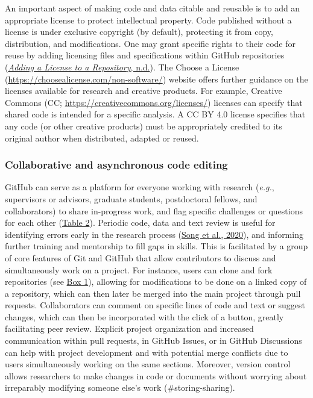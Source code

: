 An important aspect of making code and data citable and reusable is to add an appropriate license to protect intellectual property.
Code published without a license is under exclusive copyright (by default), protecting it from copy, distribution, and modifications.
One may grant specific rights to their code for reuse by adding licensing files and specifications within GitHub repositories (\protect\hyperlink{ref-TOsASkn5}{\emph{Adding a License to a Repository}, n.d.}).
The Choose a License (\url{https://choosealicense.com/non-software/}) website offers further guidance on the licenses available for research and creative products.
For example, Creative Commons (CC; \url{https://creativecommons.org/licenses/}) licenses can specify that shared code is intended for a specific analysis.
A CC BY 4.0 license specifies that any code (or other creative products) must be appropriately credited to its original author when distributed, adapted or reused.

\hypertarget{code-editing}{%
\subsubsection{Collaborative and asynchronous code editing}\label{code-editing}}

GitHub can serve as a platform for everyone working with research (\emph{e.g.}, supervisors or advisors, graduate students, postdoctoral fellows, and collaborators) to share in-progress work, and flag specific challenges or questions for each other (\protect\hyperlink{tbl:roles}{Table 2}).
Periodic code, data and text review is useful for identifying errors early in the research process (\protect\hyperlink{ref-hm9PaCLD}{Song et al., 2020}), and informing further training and mentorship to fill gaps in skills.
This is facilitated by a group of core features of Git and GitHub that allow contributors to discuss and simultaneously work on a project.
For instance, users can clone and fork repositories (see \protect\hyperlink{definitions}{Box 1}), allowing for modifications to be done on a linked copy of a repository, which can then later be merged into the main project through pull requests.
Collaborators can comment on specific lines of code and text or suggest changes, which can then be incorporated with the click of a button, greatly facilitating peer review.
Explicit project organization and increased communication within pull requests, in GitHub Issues, or in GitHub Discussions can help with project development and with potential merge conflicts due to users simultaneously working on the same sections.
Moreover, version control allows researchers to make changes in code or documents without worrying about irreparably modifying someone else's work (\#storing-sharing).

